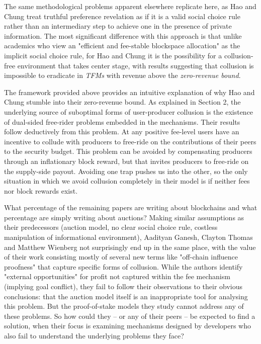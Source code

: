 \documentclass[sigconf,anonymous]{aamas}
\begin{document}
The same methodological problems apparent elsewhere replicate here, as Hao and Chung treat truthful preference revelation as if it is a valid social choice rule rather than an intermediary step to achieve one in the presence of private information. The most significant difference with this approach is that unlike academics who view an "efficient and fee-stable blockspace allocation" as the implicit social choice rule, for Hao and Chung it is the possibility for a collusion-free environment that takes center stage, with results suggesting that collusion is impossible to eradicate in \textit{TFMs} with revenue above the \textit{zero-revenue bound}.

The framework provided above provides an intuitive explanation of why Hao and Chung stumble into their zero-revenue bound. As explained in Section 2, the underlying source of suboptimal forms of user-producer collusion is the existence of dual-sided free-rider problems embedded in the mechanisms. Their results follow deductively from this problem. At any positive fee-level users have an incentive to collude with producers to free-ride on the contributions of their peers to the security budget. This problem can be avoided by compensating producers through an inflationary block reward, but that invites producers to free-ride on the supply-side payout. Avoiding one trap pushes us into the other, so the only situation in which we avoid collusion completely in their model is if neither fees nor block rewards exist.



What percentage of the remaining papers are writing about blockchains and what percentage are simply writing about auctions? Making similar assumptions as their predecessors (auction model, no clear social choice rule, costless manipulation of informational environment), Aadityan Ganesh, Clayton Thomas and Matthew Wienberg not surprisingly end up in the same place, with the value of their work consisting mostly of several new terms like "off-chain influence proofness" that capture specific forms of collusion. While the authors identify "external opportunities" for profit not captured within the fee mechanism (implying goal conflict), they fail to follow their observations to their obvious conclusions: that the auction model itself is an inappropriate tool for analysing this problem. But the proof-of-stake models they study cannot address any of these problems. So how could they -- or any of their peers -- be expected to find a solution, when their focus is examining mechanisms designed by developers who also fail to understand the underlying problems they face?
\end{document}

